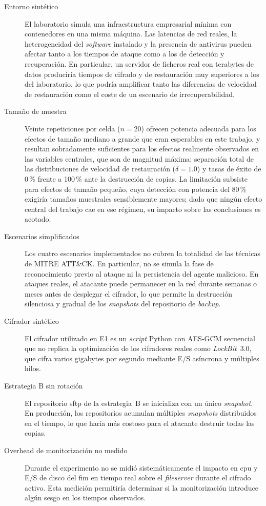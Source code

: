 \documentclass[../main.tex]{subfiles}
\begin{document}
\begin{description}
  \item[Entorno sintético] El laboratorio simula una infraestructura empresarial
  mínima con contenedores en una misma máquina. Las latencias de red reales, la
  heterogeneidad del \emph{software} instalado y la presencia de antivirus pueden
  afectar tanto a los tiempos de ataque como a los de detección y recuperación.
  En particular, un servidor de ficheros real con terabytes de datos produciría
  tiempos de cifrado y de restauración muy superiores a los del laboratorio, lo que
  podría amplificar tanto las diferencias de velocidad de restauración como el coste
  de un escenario de irrecuperabilidad.

  \item[Tamaño de muestra] Veinte repeticiones por celda ($n = 20$) ofrecen potencia
  adecuada para los efectos de tamaño mediano a grande que eran esperables en este
  trabajo, y resultan sobradamente suficientes para los efectos realmente observados
  en las variables centrales, que son de magnitud máxima: separación total de las
  distribuciones de velocidad de restauración ($\delta = 1.0$) y tasas de éxito de
  0\,\% frente a 100\,\% ante la destrucción de copias. La limitación subsiste para
  efectos de tamaño pequeño, cuya detección con potencia del 80\,\% exigiría
  tamaños muestrales sensiblemente mayores; dado que ningún efecto central del
  trabajo cae en ese régimen, su impacto sobre las conclusiones es acotado.

  \item[Escenarios simplificados] Los cuatro escenarios implementados no cubren la
  totalidad de las técnicas de MITRE ATT\&CK. En particular, no se simula la fase
  de reconocimiento previo al ataque ni la persistencia del agente malicioso. En
  ataques reales, el atacante puede permanecer en la red durante semanas o meses
  antes de desplegar el cifrador, lo que permite la destrucción silenciosa y gradual
  de los \emph{snapshots} del repositorio de \emph{backup}.

  \item[Cifrador sintético] El cifrador utilizado en E1 es un \emph{script} Python
  con AES-GCM secuencial que no replica la optimización de los cifradores reales
  como \emph{LockBit}~3.0, que cifra varios gigabytes por segundo mediante E/S
  asíncrona y múltiples hilos.

  \item[Estrategia B sin rotación] El repositorio \gls{sftp} de la estrategia~B
  se inicializa con un único \emph{snapshot}. En producción, los repositorios
  acumulan múltiples \emph{snapshots} distribuidos en el tiempo, lo que haría más
  costoso para el atacante destruir todas las copias.

  \item[Overhead de monitorización no medido] Durante el experimento no se midió
  sistemáticamente el impacto en \gls{cpu} y E/S de disco del \gls{fim} en tiempo
  real sobre el \emph{fileserver} durante el cifrado activo. Esta medición
  permitiría determinar si la monitorización introduce algún sesgo en los tiempos
  observados.
\end{description}
\end{document}
